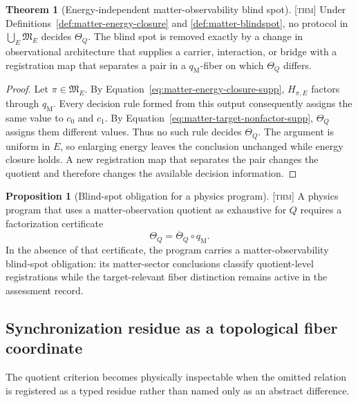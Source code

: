\documentclass[11pt]{article}
\newcommand{\Thm}{\textsc{[thm]}}
\theoremstyle{definition}
\newtheorem{sproposition}{Proposition}
\newtheorem{stheorem}[sdefinition]{Theorem}
\begin{document}
\begin{stheorem}[Energy-independent matter-observability blind spot]
\label{thm:matter-blindspot}
\Thm{} Under Definitions~\ref{def:matter-energy-closure} and
\ref{def:matter-blindspot}, no protocol in $\bigcup_E\mathfrak M_E$ decides
$\Theta_Q$. The blind spot is removed exactly by a change in observational
architecture that supplies a carrier, interaction, or bridge with a registration
map that separates a pair in a $q_{\mathrm M}$-fiber on which $\Theta_Q$ differs.
\end{stheorem}

\begin{proof}
Let $\pi\in\mathfrak M_E$. By Equation~\eqref{eq:matter-energy-closure-supp},
$H_{\pi,E}$ factors through $q_{\mathrm M}$. Every decision rule formed from this
output consequently assigns the same value to $c_0$ and $c_1$. By
Equation~\eqref{eq:matter-target-nonfactor-supp}, $\Theta_Q$ assigns them
different values. Thus no such rule decides $\Theta_Q$. The argument is uniform in
$E$, so enlarging energy leaves the conclusion unchanged while energy closure
holds. A new registration map that separates the pair changes the quotient and
therefore changes the available decision information.
\end{proof}

\begin{sproposition}[Blind-spot obligation for a physics program]
\label{prop:blindspot-obligation}
\Thm{} A physics program that uses a matter-observation quotient as exhaustive for
$Q$ requires a factorization certificate
\begin{equation}
\Theta_Q=\overline\Theta_Q\circ q_{\mathrm M}.
\label{eq:matter-factorization-certificate-supp}
\end{equation}
In the absence of that certificate, the program carries a matter-observability
blind-spot obligation: its matter-sector conclusions classify quotient-level
registrations while the target-relevant fiber distinction remains active in the
assessment record.
\end{sproposition}


\subsection{Synchronization residue as a topological fiber coordinate}
\label{supp:synchronization-residue}

The quotient criterion becomes physically inspectable when the omitted relation is
registered as a typed residue rather than named only as an abstract difference.
\end{document}
